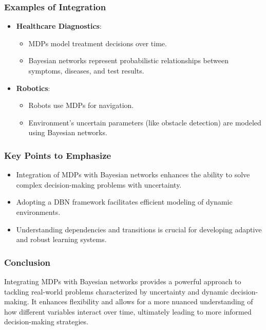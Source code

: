 \documentclass[aspectratio=169]{beamer}
\begin{document}
\begin{frame}[fragile]
    \frametitle{Examples of Integration}
    
    \begin{itemize}
        \item \textbf{Healthcare Diagnostics}: 
        \begin{itemize}
            \item MDPs model treatment decisions over time.
            \item Bayesian networks represent probabilistic relationships between symptoms, diseases, and test results.
        \end{itemize}
        
        \item \textbf{Robotics}: 
        \begin{itemize}
            \item Robots use MDPs for navigation.
            \item Environment's uncertain parameters (like obstacle detection) are modeled using Bayesian networks.
        \end{itemize}
    \end{itemize}
\end{frame}

\begin{frame}[fragile]
    \frametitle{Key Points to Emphasize}
    
    \begin{itemize}
        \item Integration of MDPs with Bayesian networks enhances the ability to solve complex decision-making problems with uncertainty.
        \item Adopting a DBN framework facilitates efficient modeling of dynamic environments.
        \item Understanding dependencies and transitions is crucial for developing adaptive and robust learning systems.
    \end{itemize}
\end{frame}

\begin{frame}[fragile]
    \frametitle{Conclusion}
    
    Integrating MDPs with Bayesian networks provides a powerful approach to tackling real-world problems characterized by uncertainty and dynamic decision-making. It enhances flexibility and allows for a more nuanced understanding of how different variables interact over time, ultimately leading to more informed decision-making strategies.
\end{frame}
\end{document}
